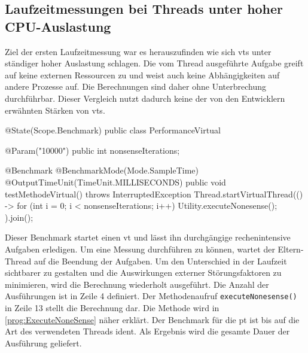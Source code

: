 \subsection{Laufzeitmessungen bei Threads unter hoher CPU-Auslastung}                                         
\label{subsec:LaufzeitmessungenbeiThreadsunterhoherAuslastung}

    Ziel der ersten Laufzeitmessung war es herauszufinden wie sich \Glspl{vt} unter ständiger hoher Auslastung schlagen. Die vom Thread ausgeführte Aufgabe greift auf keine 
    externen Ressourcen zu und weist auch keine Abhängigkeiten auf andere Prozesse auf. Die Berechnungen sind daher ohne Unterbrechung durchführbar.
    Dieser Vergleich nutzt dadurch keine der von den Entwicklern erwähnten  Stärken von \Glspl{vt}.
    \begin{program} [H]
        \caption{Benchmark eines \Glspl{vt} unter hoher Auslastung}
        \label{prog:BenchmarkEinesVTUnterHoherAuslastung}
    \begin{JavaCode}[language=Java, numbers=left]
@State(Scope.Benchmark)
public class PerformanceVirtual {

    @Param("10000")
    public int nonsenseIterations;

    @Benchmark
    @BenchmarkMode(Mode.SampleTime)
    @OutputTimeUnit(TimeUnit.MILLISECONDS)
    public void testMethodeVirtual() throws InterruptedException {
        Thread.startVirtualThread(() -> {
            for (int i = 0; i < nonsenseIterations; i++)
                Utility.executeNonesense();
        }).join();
    }
}\end{JavaCode}
    \end{program}
    Dieser Benchmark startet einen \gls{vt} und lässt ihn durchgängige rechenintensive Aufgaben erledigen. Um eine Messung durchführen zu können, wartet der Eltern-Thread auf
    die Beendung der Aufgaben. Um den Unterschied in der Laufzeit sichtbarer zu gestalten und die Auswirkungen externer Störungsfaktoren zu minimieren,
    wird die Berechnung wiederholt ausgeführt. Die Anzahl der Ausführungen ist in Zeile 4 definiert. Der Methodenaufruf \texttt{executeNonesense()} in Zeile 13 stellt die Berechnung dar.
    Die Methode wird in \ref{prog:ExecuteNoneSense} näher erklärt. Der Benchmark für die \gls{pt} ist bis auf die Art des verwendeten Threads ident.
    Als Ergebnis wird die gesamte Dauer der Ausführung geliefert. 

